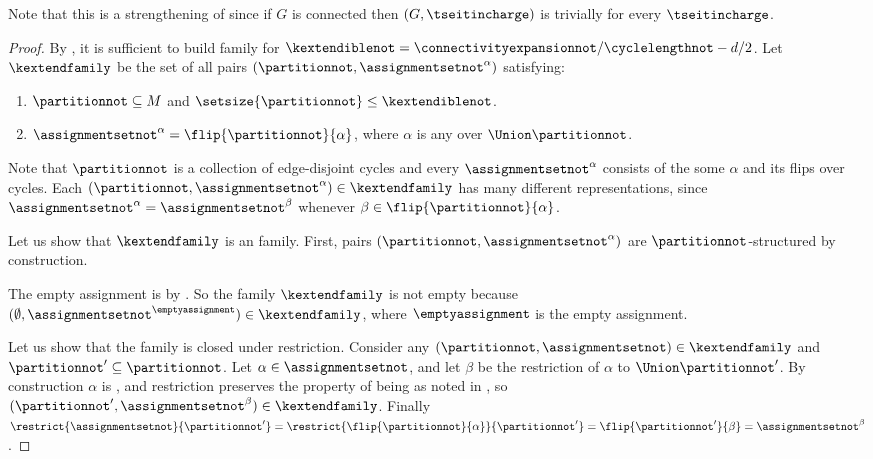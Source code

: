 Note that this is a strengthening of  since if $G$ is connected then $(G,\tseitincharge)$ is trivially \Gnonsplitting for every $\tseitincharge$.

\begin{proof}
  By , it is sufficient to build \akextendible family for $\kextendiblenot = \connectivityexpansionnot / \cyclelengthnot - d/2$. Let $\kextendfamily$ be the set of all pairs $(\partitionnot,\assignmentsetnot^\alpha)$ satisfying:
  \begin{enumerate}
  \item $\partitionnot\subseteq M$ and $\setsize{\partitionnot}\leq \kextendiblenot$.
  \item $\assignmentsetnot^{\alpha}=\flip{\partitionnot}{\alpha}$, where $\alpha$ is any \nonsplittingassignment over $\Union \partitionnot$.
  \end{enumerate}
  Note that $\partitionnot$ is a collection of edge-disjoint cycles and every $\assignmentsetnot^\alpha$ consists of the some \nonsplittingassignment $\alpha$ and its flips over cycles. Each $(\partitionnot,\assignmentsetnot^{\alpha}) \in \kextendfamily$ has many different representations, since $\assignmentsetnot^{\alpha}=\assignmentsetnot^{\beta}$ whenever $\beta\in\flip{\partitionnot}{\alpha}$.

  Let us show that $\kextendfamily$ is an \kextendibleNok family. First, pairs $(\partitionnot,\assignmentsetnot^{\alpha})$ are $\partitionnot$-structured by construction.
  
  The empty assignment is \nonsplitting by . So the family $\kextendfamily$ is not empty because $(\emptyset,\assignmentsetnot^{\emptyassignment})\in\kextendfamily$, where $\emptyassignment$ is the empty assignment.

  Let us show that the family is closed under restriction. Consider any $(\partitionnot,\assignmentsetnot)\in\kextendfamily$ and $\partitionnot'\subseteq \partitionnot$. Let $\alpha\in\assignmentsetnot$, and let $\beta$ be the restriction of $\alpha$ to $\Union\partitionnot'$. By construction $\alpha$ is \nonsplitting, and restriction preserves the property of being \nonsplitting as noted in , so $(\partitionnot',\assignmentsetnot^{\beta})\in\kextendfamily$. Finally $\restrict{\assignmentsetnot}{\partitionnot'}=\restrict{\flip{\partitionnot}{\alpha}}{\partitionnot'}=\flip{\partitionnot'}{\beta}=\assignmentsetnot^{\beta}$.


\end{proof}
